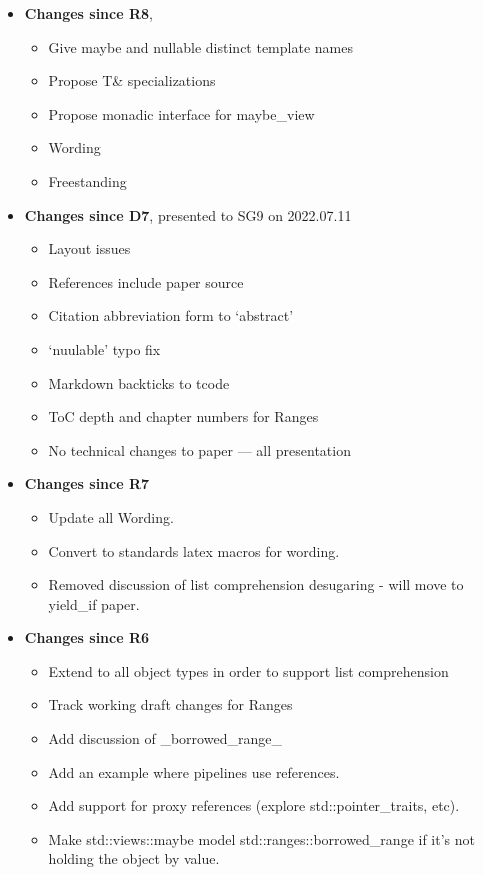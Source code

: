 \documentclass[a4paper,10pt,oneside,openany,final,article]{memoir}
\begin{document}
\begin{itemize}
\item \textbf{Changes since R8},
  \begin{itemize}
  \item Give maybe and nullable distinct template names
  \item Propose T\& specializations
  \item Propose monadic interface for maybe_view
  \item Wording
  \item Freestanding
  \end{itemize}
\item \textbf{Changes since D7}, presented to SG9 on 2022.07.11
  \begin{itemize}
  \item Layout issues
  \item References include paper source
  \item Citation abbreviation form to `abstract'
  \item `nuulable' typo fix
  \item Markdown backticks to tcode
  \item ToC depth and chapter numbers for Ranges
  \item No technical changes to paper --- all presentation
  \end{itemize}
\item \textbf{Changes since R7}
  \begin{itemize}
  \item Update all Wording.
  \item Convert to standards latex macros for wording.
  \item Removed discussion of list comprehension desugaring - will move to yield_if paper.
  \end{itemize}
\item \textbf{Changes since R6}
  \begin{itemize}
  \item Extend to all object types in order to support list comprehension
  \item Track working draft changes for Ranges
  \item Add discussion of _borrowed_range_
  \item Add an example where pipelines use references.
  \item Add support for proxy references (explore std::pointer_traits, etc).
  \item Make std::views::maybe model std::ranges::borrowed_range if it's not holding the object by value.

\end{itemize}
\end{itemize}
\end{document}
